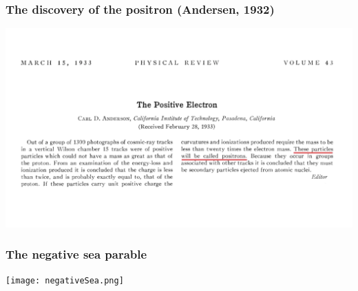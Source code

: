 \begin{frame}
\frametitle{The discovery of the positron (Andersen, 1932)}

\includegraphics[scale=0.3]{img/AndersonPaper.png}
\end{frame}

%
%

\begin{frame}
\frametitle{The negative sea parable}

\texttt{[image: negativeSea.png]}
\end{frame}

%
%
%
%
%






